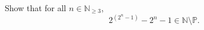 \begin{problem}
    Show that for all \( n \in \mathbb{N}_{\geq 3} \),
    \[
        2^{\left(2^n-1\right)}-2^n-1 \in \mathbb{N} \setminus \mathbb{P}.
    \]
\end{problem}
